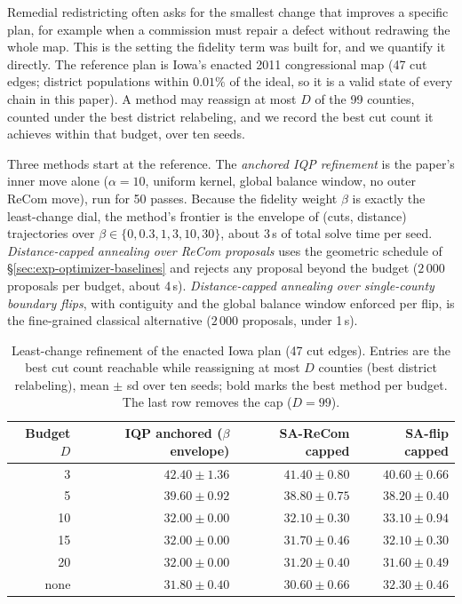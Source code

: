 \documentclass[11pt]{article}
\begin{document}
Remedial redistricting often asks for the smallest change that
improves a specific plan, for example when a commission must repair a
defect without redrawing the whole map. This is the setting the
fidelity term was built for, and we quantify it directly. The
reference plan is Iowa's enacted 2011 congressional map (47 cut
edges; district populations within $0.01\%$ of the ideal, so it is a
valid state of every chain in this paper). A method may reassign at
most $D$ of the 99 counties, counted under the best district
relabeling, and we record the best cut count it achieves within that
budget, over ten seeds.

Three methods start at the reference. The \emph{anchored IQP
refinement} is the paper's inner move alone ($\alpha = 10$, uniform
kernel, global balance window, no outer ReCom move), run for 50
passes. Because the fidelity weight $\beta$ is exactly the
least-change dial, the method's frontier is the envelope of (cuts,
distance) trajectories over $\beta \in \{0, 0.3, 1, 3, 10, 30\}$,
about 3\,s of total solve time per seed. \emph{Distance-capped
annealing over ReCom proposals} uses the geometric schedule of
\S\ref{sec:exp-optimizer-baselines} and rejects any proposal beyond
the budget ($2\,000$ proposals per budget, about 4\,s).
\emph{Distance-capped annealing over single-county boundary flips},
with contiguity and the global balance window enforced per flip, is
the fine-grained classical alternative ($2\,000$ proposals, under
1\,s).

\begin{table}[H]
\centering
\small
\begin{tabular}{rrrr}
\toprule
Budget $D$ & IQP anchored ($\beta$ envelope) & SA-ReCom capped & SA-flip capped \\
\midrule
3  & $42.40 \pm 1.36$ & $41.40 \pm 0.80$ & $\mathbf{40.60 \pm 0.66}$ \\
5  & $39.60 \pm 0.92$ & $38.80 \pm 0.75$ & $\mathbf{38.20 \pm 0.40}$ \\
10 & $\mathbf{32.00 \pm 0.00}$ & $32.10 \pm 0.30$ & $33.10 \pm 0.94$ \\
15 & $32.00 \pm 0.00$ & $\mathbf{31.70 \pm 0.46}$ & $32.10 \pm 0.30$ \\
20 & $32.00 \pm 0.00$ & $\mathbf{31.20 \pm 0.40}$ & $31.60 \pm 0.49$ \\
none & $31.80 \pm 0.40$ & $\mathbf{30.60 \pm 0.66}$ & $32.30 \pm 0.46$ \\
\bottomrule
\end{tabular}
\caption{Least-change refinement of the enacted Iowa plan (47 cut
  edges). Entries are the best cut count reachable while reassigning
  at most $D$ counties (best district relabeling), mean $\pm$ sd over
  ten seeds; bold marks the best method per budget. The last row
  removes the cap ($D = 99$).}\label{tab:least-change}
\end{table}
\end{document}
